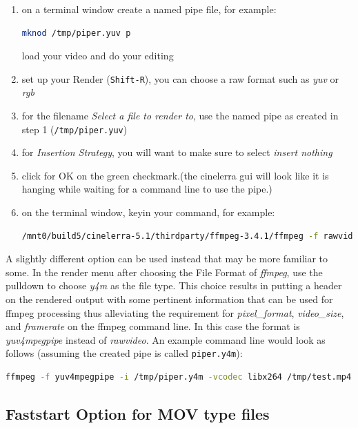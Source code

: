 \begin{enumerate}
    \item on a terminal window create a named pipe file, for example:
    \begin{lstlisting}[language=bash,numbers=none]
mknod /tmp/piper.yuv p
    \end{lstlisting}
    load your video and do your editing
    \item set up your Render (\texttt{Shift-R}), you can choose a raw format such as \textit{yuv} or \textit{rgb}
    \item for the filename \textit{Select a file to render to}, use the named pipe as created in step 1 (\texttt{/tmp/piper.yuv})
    \item for \textit{Insertion Strategy}, you will want to make sure to select \textit{insert nothing}
    \item click for OK on the green checkmark.(the cinelerra gui will look like it is hanging while waiting for a command line to use the pipe.)
    \item on the terminal window, keyin your command, for example:
    \begin{lstlisting}[language=bash,numbers=none]
/mnt0/build5/cinelerra-5.1/thirdparty/ffmpeg-3.4.1/ffmpeg -f rawvideo -pixel_format yuv420p \ -video_size 1280x720 -framerate 30000/1001 -i /tmp/piper.yuv /tmp/pys.mov
    \end{lstlisting}
\end{enumerate}

A slightly different option can be used instead that may be more familiar to some.  In the render menu after choosing the File Format of \textit{ffmpeg}, use the pulldown to choose \textit{y4m} as the file type.  This choice results in putting a header on the rendered output with some pertinent information that can be used for ffmpeg processing thus alleviating the requirement for \textit{pixel\_format}, \textit{video\_size}, and \textit{framerate} on the ffmpeg command line.  In this case the format is \textit{yuv4mpegpipe} instead of \textit{rawvideo}.  An example command line would look as follows (assuming the created pipe is called \texttt{piper.y4m}):
\begin{lstlisting}[language=bash,numbers=none]
ffmpeg -f yuv4mpegpipe -i /tmp/piper.y4m -vcodec libx264 /tmp/test.mp4
\end{lstlisting}

\subsection{Faststart Option for MOV type files}%
\label{sub:faststart_option_mov0}


